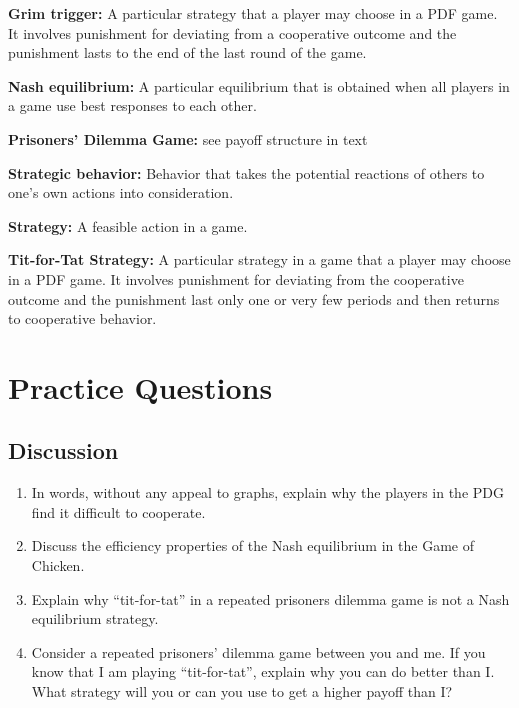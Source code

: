 \documentclass[
]{book}
\providecommand{\tightlist}{%
  \setlength{\itemsep}{0pt}\setlength{\parskip}{0pt}}
\begin{document}
\textbf{Grim trigger:} A particular strategy that a player may choose in a PDF game. It involves punishment for deviating from a cooperative outcome and the punishment lasts to the end of the last round of the game.

\textbf{Nash equilibrium:} A particular equilibrium that is obtained when all players in a game use best responses to each other.

\textbf{Prisoners' Dilemma Game:} see payoff structure in text

\textbf{Strategic behavior:} Behavior that takes the potential reactions of others to one's own actions into consideration.

\textbf{Strategy:} A feasible action in a game.

\textbf{Tit-for-Tat Strategy:} A particular strategy in a game that a player may choose in a PDF game. It involves punishment for deviating from the cooperative outcome and the punishment last only one or very few periods and then returns to cooperative behavior.

\hypertarget{practice-questions-8}{%
\section{Practice Questions}\label{practice-questions-8}}

\hypertarget{discussion-8}{%
\subsection{Discussion}\label{discussion-8}}

\begin{enumerate}
\def\labelenumi{\arabic{enumi}.}
\tightlist
\item
  In words, without any appeal to graphs, explain why the players in the PDG find it difficult to cooperate.
\item
  Discuss the efficiency properties of the Nash equilibrium in the Game of Chicken.\\
\item
  Explain why ``tit-for-tat'' in a repeated prisoners dilemma game is not a Nash equilibrium strategy.
\item
  Consider a repeated prisoners' dilemma game between you and me. If you know that I am playing ``tit-for-tat'', explain why you can do better than I. What strategy will you or can you use to get a higher payoff than I?
\end{enumerate}
\end{document}
